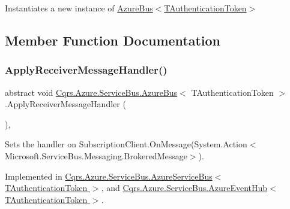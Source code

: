 Instantiates a new instance of \hyperlink{classCqrs_1_1Azure_1_1ServiceBus_1_1AzureBus_a1046ff74282fd178f43e28420433d2a9_a1046ff74282fd178f43e28420433d2a9}{Azure\+Bus$<$\+T\+Authentication\+Token$>$} 



\subsection{Member Function Documentation}
\mbox{\label{classCqrs_1_1Azure_1_1ServiceBus_1_1AzureBus_aad25a164e9e526c59d8ef98635c98095_aad25a164e9e526c59d8ef98635c98095}} 
\subsubsection{\texorpdfstring{Apply\+Receiver\+Message\+Handler()}{ApplyReceiverMessageHandler()}}
{\footnotesize\ttfamily abstract void \hyperlink{classCqrs_1_1Azure_1_1ServiceBus_1_1AzureBus}{Cqrs.\+Azure.\+Service\+Bus.\+Azure\+Bus}$<$ T\+Authentication\+Token $>$.Apply\+Receiver\+Message\+Handler (\begin{DoxyParamCaption}{ }\end{DoxyParamCaption})\hspace{0.3cm}{\ttfamily [protected]}, {}}



Sets the handler on Subscription\+Client.\+On\+Message(\+System.\+Action$<$\+Microsoft.\+Service\+Bus.\+Messaging.\+Brokered\+Message$>$). 



Implemented in \hyperlink{classCqrs_1_1Azure_1_1ServiceBus_1_1AzureServiceBus_a6ea94560e02fce0d920c467062f5fc98_a6ea94560e02fce0d920c467062f5fc98}{Cqrs.\+Azure.\+Service\+Bus.\+Azure\+Service\+Bus$<$ T\+Authentication\+Token $>$}, and \hyperlink{classCqrs_1_1Azure_1_1ServiceBus_1_1AzureEventHub_af2efc497815828b6fe0b4d6621bc8b41_af2efc497815828b6fe0b4d6621bc8b41}{Cqrs.\+Azure.\+Service\+Bus.\+Azure\+Event\+Hub$<$ T\+Authentication\+Token $>$}.

\mbox{\label{classCqrs_1_1Azure_1_1ServiceBus_1_1AzureBus_a514e371d5ce093678365af31e6c274e3_a514e371d5ce093678365af31e6c274e3}} 
